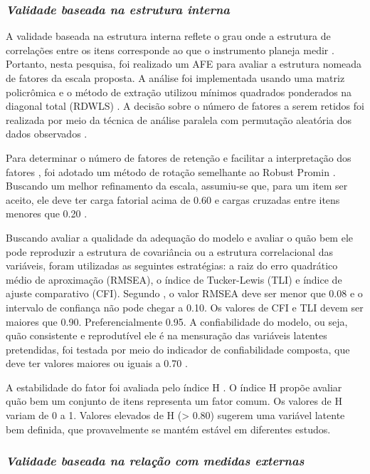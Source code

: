 \subsubsection*{\textit{Validade baseada na estrutura interna}}

A validade baseada na estrutura interna reflete o grau onde a estrutura de correlações entre os itens corresponde ao que o instrumento planeja medir \cite{Association2018}. Portanto, nesta pesquisa, foi realizado um AFE para avaliar a estrutura nomeada de fatores da escala proposta. A análise foi implementada usando uma matriz policrômica e o método de extração utilizou mínimos quadrados ponderados na diagonal total (RDWLS) \cite{Asparouhov2010}. A decisão sobre o número de fatores a serem retidos foi realizada por meio da técnica de análise paralela com permutação aleatória dos dados observados \cite{Timmerman2011}.

Para determinar o número de fatores de retenção e facilitar a interpretação dos fatores \cite{Damasio2012}, foi adotado um método de rotação semelhante ao  Robust Promin \cite{Ferrando2018AssessingAnalysis}. Buscando um melhor refinamento da escala, assumiu-se que, para um item ser aceito, ele deve ter carga fatorial acima de 0.60 e cargas cruzadas entre itens menores que 0.20 \cite{Howard2016AImprove}.


Buscando avaliar a qualidade da adequação do modelo e avaliar o quão bem ele pode reproduzir a estrutura de covariância ou a estrutura correlacional das variáveis, foram utilizadas as seguintes estratégias: a raiz do erro quadrático médio de aproximação (RMSEA), o índice de Tucker-Lewis (TLI) e índice de ajuste comparativo (CFI). Segundo , o valor RMSEA deve ser menor que 0.08 e o intervalo de confiança não pode chegar a 0.10. Os valores de CFI e TLI devem ser maiores que 0.90. Preferencialmente 0.95. A confiabilidade do modelo, ou seja, quão consistente e reprodutível ele é na mensuração das variáveis latentes pretendidas, foi testada por meio do indicador de confiabilidade composta, que deve ter valores maiores ou iguais a 0.70 \cite{Hair2009}.

A estabilidade do fator foi avaliada pelo índice H \cite{Lorenzo-Seva2019}. O índice H propõe avaliar quão bem um conjunto de itens representa um fator comum. Os valores de H variam de 0 a 1. Valores elevados de H (> 0.80) sugerem uma variável latente bem definida, que provavelmente se mantém estável em diferentes estudos.

\subsubsection*{\textit{Validade baseada na relação com medidas externas}}

